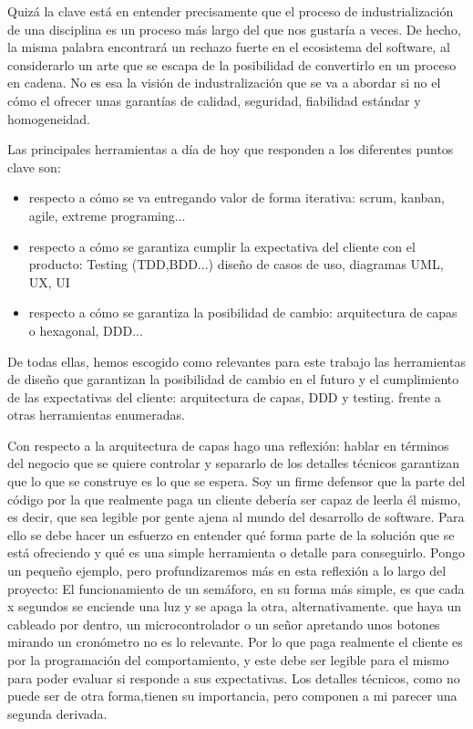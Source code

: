 Quizá la clave está en entender precisamente que el proceso de industrialización de una disciplina es un proceso más largo del que nos gustaría a veces. De hecho, la misma palabra encontrará un rechazo fuerte en el ecosistema del software, al considerarlo un arte que se escapa de la posibilidad de convertirlo en un proceso en cadena. No es esa la visión de industralización que se va a abordar si no el cómo el ofrecer unas garantías de calidad, seguridad, fiabilidad estándar y homogeneidad.

Las principales herramientas a día de hoy que responden a los diferentes puntos clave son:

\begin{itemize}
	\item respecto a cómo se va entregando valor de forma iterativa: scrum, kanban, agile, extreme programing...
	\item respecto a cómo se garantiza cumplir la expectativa del cliente con el producto: Testing (TDD,BDD...) diseño de casos de uso, diagramas UML, UX, UI
	\item respecto a cómo se garantiza la posibilidad de cambio: arquitectura de capas o hexagonal, DDD... 
\end{itemize} 

De todas ellas, hemos escogido como relevantes para este trabajo las herramientas de diseño que garantizan la posibilidad de cambio en el futuro y el cumplimiento de las expectativas del cliente: arquitectura de capas, DDD y testing. frente a otras herramientas enumeradas.

Con respecto a la arquitectura de capas hago una reflexión: hablar en términos del negocio que se quiere controlar y separarlo de los detalles técnicos garantizan que lo que se construye es lo que se espera. Soy un firme defensor que la parte del código por la que realmente paga un cliente debería ser capaz de leerla él mismo, es decir, que sea legible por gente ajena al mundo del desarrollo de software. Para ello se debe hacer un esfuerzo en entender qué forma parte de la solución que se está ofreciendo y qué es una simple herramienta o detalle para conseguirlo. Pongo un pequeño ejemplo, pero profundizaremos más en esta reflexión a lo largo del proyecto: El funcionamiento de un semáforo, en su forma más simple, es que cada x segundos se enciende una luz y se apaga la otra, alternativamente. que haya un cableado por dentro, un microcontrolador o un señor apretando unos botones mirando un cronómetro no es lo relevante. Por lo que paga realmente el cliente es por la programación del comportamiento, y este debe ser legible para el mismo para poder evaluar si responde a sus expectativas. Los detalles técnicos, como no puede ser de otra forma,tienen su importancia, pero componen a mi parecer una segunda derivada.

